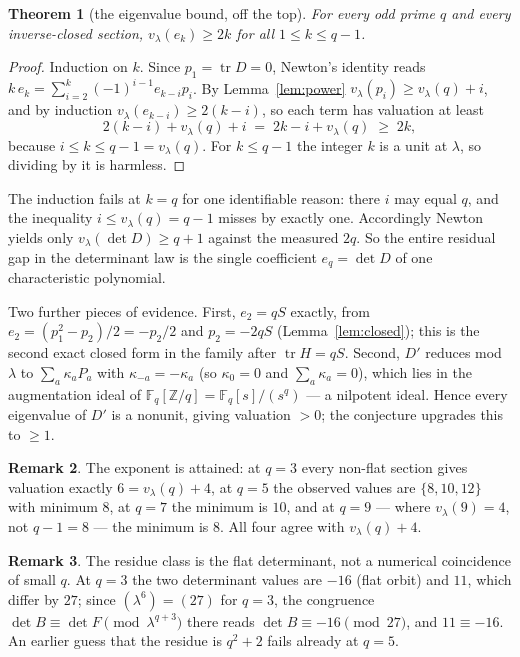 \documentclass[11pt]{article}
\theoremstyle{plain}
\newtheorem{theorem}{Theorem}
\theoremstyle{definition}
\newtheorem{remark}[theorem]{Remark}
\newcommand{\FF}{\mathbb F}
\newcommand{\ZZ}{\mathbb Z}
\newcommand{\tr}{\operatorname{tr}}
\newcommand{\vlam}{v_\lambda}
\begin{document}
\begin{theorem}[the eigenvalue bound, off the top]\label{thm:ek2k}
For every odd prime $q$ and every inverse-closed section,
$\vlam(e_k)\ge 2k$ for all $1\le k\le q-1$.
\end{theorem}

\begin{proof}
Induction on $k$. Since $p_1=\tr D=0$, Newton's identity reads
$k\,e_k=\sum_{i=2}^{k}(-1)^{i-1}e_{k-i}p_i$. By Lemma~\ref{lem:power}
$\vlam(p_i)\ge\vlam(q)+i$, and by induction $\vlam(e_{k-i})\ge2(k-i)$, so each
term has valuation at least
\[
2(k-i)+\vlam(q)+i \;=\; 2k-i+\vlam(q)\;\ge\;2k ,
\]
because $i\le k\le q-1=\vlam(q)$. For $k\le q-1$ the integer $k$ is a unit at
$\lambda$, so dividing by it is harmless.
\end{proof}

The induction fails at $k=q$ for one identifiable reason: there $i$ may equal
$q$, and the inequality $i\le\vlam(q)=q-1$ misses by exactly one. Accordingly
Newton yields only $\vlam(\det D)\ge q+1$ against the measured $2q$. So the
entire residual gap in the determinant law is the single coefficient
$e_q=\det D$ of one characteristic polynomial.

Two further pieces of evidence. First, $e_2=qS$ exactly, from
$e_2=(p_1^2-p_2)/2=-p_2/2$ and $p_2=-2qS$ (Lemma~\ref{lem:closed}); this is the
second exact closed form in the family after $\tr H=qS$. Second, $D'$ reduces
mod $\lambda$ to $\sum_a\kappa_aP_a$ with $\kappa_{-a}=-\kappa_a$ (so
$\kappa_0=0$ and $\sum_a\kappa_a=0$), which lies in the augmentation ideal of
$\FF_q[\ZZ/q]=\FF_q[s]/(s^{q})$ --- a nilpotent ideal. Hence every eigenvalue
of $D'$ is a nonunit, giving valuation $>0$; the conjecture upgrades this to
$\ge1$.

\begin{remark}
The exponent is attained: at $q=3$ every non-flat section gives valuation
exactly $6=\vlam(q)+4$, at $q=5$ the observed values are $\{8,10,12\}$ with
minimum $8$, at $q=7$ the minimum is $10$, and at $q=9$ --- where
$\vlam(9)=4$, not $q-1=8$ --- the minimum is $8$. All four agree with
$\vlam(q)+4$.
\end{remark}

\begin{remark}
The residue class is the flat determinant, not a numerical coincidence of small
$q$. At $q=3$ the two determinant values are $-16$ (flat orbit) and $11$, which
differ by $27$; since $(\lambda^{6})=(27)$ for $q=3$, the congruence
$\det B\equiv\det F\pmod{\lambda^{q+3}}$ there reads $\det B\equiv-16\pmod{27}$,
and $11\equiv-16$. An earlier guess that the residue is $q^2+2$ fails already
at $q=5$.
\end{remark}
\end{document}
